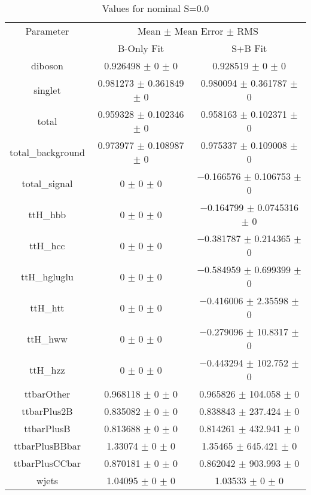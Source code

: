 \begin{table}
\centering
\caption{Values for nominal S=0.0}
\begin{tabular}{ccc}
\toprule
Parameter & \multicolumn{2}{c}{Mean $\pm$ Mean Error $\pm$ RMS}\\
 & B-Only Fit & S+B Fit\\
\midrule
diboson & \num{0.926498} $\pm$ \num{0} $\pm$ \num{0} & \num{0.928519} $\pm$ \num{0} $\pm$ \num{0}\\
singlet & \num{0.981273} $\pm$ \num{0.361849} $\pm$ \num{0} & \num{0.980094} $\pm$ \num{0.361787} $\pm$ \num{0}\\
total & \num{0.959328} $\pm$ \num{0.102346} $\pm$ \num{0} & \num{0.958163} $\pm$ \num{0.102371} $\pm$ \num{0}\\
total\_background & \num{0.973977} $\pm$ \num{0.108987} $\pm$ \num{0} & \num{0.975337} $\pm$ \num{0.109008} $\pm$ \num{0}\\
total\_signal & \num{0} $\pm$ \num{0} $\pm$ \num{0} & \num{-0.166576} $\pm$ \num{0.106753} $\pm$ \num{0}\\
ttH\_hbb & \num{0} $\pm$ \num{0} $\pm$ \num{0} & \num{-0.164799} $\pm$ \num{0.0745316} $\pm$ \num{0}\\
ttH\_hcc & \num{0} $\pm$ \num{0} $\pm$ \num{0} & \num{-0.381787} $\pm$ \num{0.214365} $\pm$ \num{0}\\
ttH\_hgluglu & \num{0} $\pm$ \num{0} $\pm$ \num{0} & \num{-0.584959} $\pm$ \num{0.699399} $\pm$ \num{0}\\
ttH\_htt & \num{0} $\pm$ \num{0} $\pm$ \num{0} & \num{-0.416006} $\pm$ \num{2.35598} $\pm$ \num{0}\\
ttH\_hww & \num{0} $\pm$ \num{0} $\pm$ \num{0} & \num{-0.279096} $\pm$ \num{10.8317} $\pm$ \num{0}\\
ttH\_hzz & \num{0} $\pm$ \num{0} $\pm$ \num{0} & \num{-0.443294} $\pm$ \num{102.752} $\pm$ \num{0}\\
ttbarOther & \num{0.968118} $\pm$ \num{0} $\pm$ \num{0} & \num{0.965826} $\pm$ \num{104.058} $\pm$ \num{0}\\
ttbarPlus2B & \num{0.835082} $\pm$ \num{0} $\pm$ \num{0} & \num{0.838843} $\pm$ \num{237.424} $\pm$ \num{0}\\
ttbarPlusB & \num{0.813688} $\pm$ \num{0} $\pm$ \num{0} & \num{0.814261} $\pm$ \num{432.941} $\pm$ \num{0}\\
ttbarPlusBBbar & \num{1.33074} $\pm$ \num{0} $\pm$ \num{0} & \num{1.35465} $\pm$ \num{645.421} $\pm$ \num{0}\\
ttbarPlusCCbar & \num{0.870181} $\pm$ \num{0} $\pm$ \num{0} & \num{0.862042} $\pm$ \num{903.993} $\pm$ \num{0}\\
wjets & \num{1.04095} $\pm$ \num{0} $\pm$ \num{0} & \num{1.03533} $\pm$ \num{0} $\pm$ \num{0}\\
\bottomrule
\end{tabular}
\end{table}